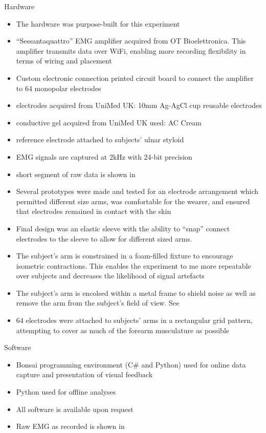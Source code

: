 \documentclass[../main.tex]{subfiles}
\begin{document}
Hardware
\begin{itemize}
  \item The hardware was purpose-built for this experiment
  \item ``Sessantaquattro'' EMG amplifier acquired from OT Bioelettronica. This amplifier transmits data over WiFi, enabling more recording flexibility in terms of wiring and placement
  \item Custom electronic connection printed circuit board to connect the amplifier to 64 monopolar electrodes
  \item electrodes acquired from UniMed UK: 10mm Ag-AgCl cup reusable electrodes 
  \item conductive gel acquired from UniMed UK used: AC Cream
  \item reference electrode attached to subjects' ulnar styloid
  \item EMG signals are captured at 2kHz with 24-bit precision
  \item short segment of raw data is shown in 
  \item Several prototypes were made and tested for an electrode arrangement which permitted different size arms, was comfortable for the wearer, and ensured that electrodes remained in contact with the skin
  \item Final design was an elastic sleeve with the ability to ``snap'' connect electrodes to the sleeve to allow for different sized arms.
  \item The subject's arm is constrained in a foam-filled fixture to encourage isometric contractions. This enables the experiment to me more repeatable over subjects and decreases the likelihood of signal artefacts
  \item The subject's arm is encolsed within a metal frame to shield noise as well as remove the arm from the subject's field of view. See 
  \item 64 electrodes were attached to subjects' arms in a rectangular grid pattern, attempting to cover as much of the forearm musculature as possible 
\end{itemize}

Software
\begin{itemize}
  \item Bonsai programming environment (C\# and Python) used for online data capture and presentation of visual feedback
  \item Python used for offline analyses
  \item All software is available upon request
  \item Raw EMG as recorded is shown in 
\end{itemize}
\end{document}
